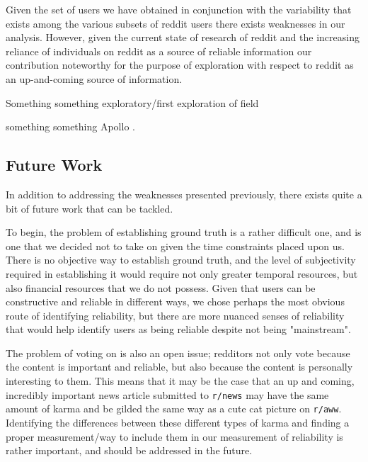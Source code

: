 Given the set of users we have obtained in conjunction with the variability that
exists among the various subsets of reddit users there exists weaknesses in our
analysis. However, given the current state of research of reddit and the
increasing reliance of individuals on reddit as a source of reliable information
our contribution noteworthy for the purpose of exploration with respect to
reddit as an up-and-coming source of information.

Something something exploratory/first exploration of field

something something Apollo \cite{Le:2011:DDL:2070942.2071018}.


\subsection{Future Work} %
\label{sub:future_work}
In addition to addressing the weaknesses presented previously, there exists
quite a bit of future work that can be tackled.

To begin, the problem of establishing ground truth is a rather difficult one,
and is one that we decided not to take on given the time constraints placed upon
us. There is no objective way to establish ground truth, and the level of
subjectivity required in establishing it would require not only greater temporal
resources, but also financial resources that we do not possess. Given that users
can be constructive and reliable in different ways, we chose perhaps the most
obvious route of identifying reliability, but there are more nuanced senses of
reliability that would help identify users as being reliable despite not being
"mainstream".

The problem of voting on \reddit{} is also an open issue; redditors not only
vote because the content is important and reliable, but also because the content
is personally interesting to them. This means that it may be the case that an up
and coming, incredibly important news article submitted to \texttt{r/news} may
have the same amount of karma and be gilded the same way as a cute cat picture
on \texttt{r/aww}. Identifying the differences between these different types of
karma and finding a proper measurement/way to include them in our measurement of
reliability is rather important, and should be addressed in the future.

